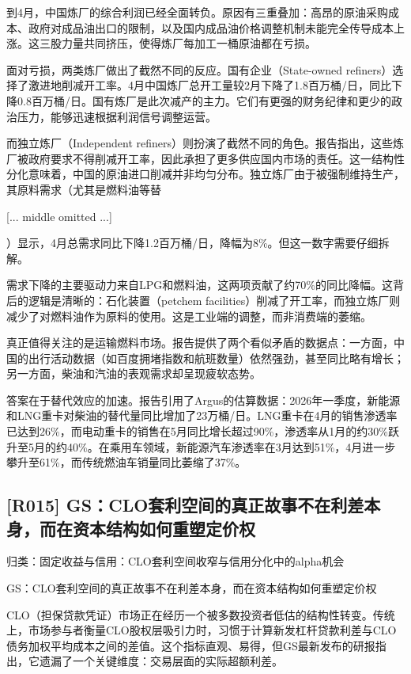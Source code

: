\documentclass[11pt]{ctexart}
\begin{document}
到4月，中国炼厂的综合利润已经全面转负。原因有三重叠加：高昂的原油采购成本、政府对成品油出口的限制，以及国内成品油价格调整机制未能完全传导成本上涨。这三股力量共同挤压，使得炼厂每加工一桶原油都在亏损。

面对亏损，两类炼厂做出了截然不同的反应。国有企业（State-owned refiners）选择了激进地削减开工率。4月中国炼厂总开工量较2月下降了1.8百万桶/日，同比下降0.8百万桶/日。国有炼厂是此次减产的主力。它们有更强的财务纪律和更少的政治压力，能够迅速根据利润信号调整运营。

而独立炼厂（Independent refiners）则扮演了截然不同的角色。报告指出，这些炼厂被政府要求不得削减开工率，因此承担了更多供应国内市场的责任。这一结构性分化意味着，中国的原油进口削减并非均匀分布。独立炼厂由于被强制维持生产，其原料需求（尤其是燃料油等替

[... middle omitted ...]

）显示，4月总需求同比下降1.2百万桶/日，降幅为8\%。但这一数字需要仔细拆解。

需求下降的主要驱动力来自LPG和燃料油，这两项贡献了约70\%的同比降幅。这背后的逻辑是清晰的：石化装置（petchem facilities）削减了开工率，而独立炼厂则减少了对燃料油作为原料的使用。这是工业端的调整，而非消费端的萎缩。

真正值得关注的是运输燃料市场。报告提供了两个看似矛盾的数据点：一方面，中国的出行活动数据（如百度拥堵指数和航班数量）依然强劲，甚至同比略有增长；另一方面，柴油和汽油的表观需求却呈现疲软态势。

答案在于替代效应的加速。报告引用了Argus的估算数据：2026年一季度，新能源和LNG重卡对柴油的替代量同比增加了23万桶/日。LNG重卡在4月的销售渗透率已达到26\%，而电动重卡的销售在5月同比增长超过90\%，渗透率从1月的约30\%跃升至5月的约40\%。在乘用车领域，新能源汽车渗透率在3月达到51\%，4月进一步攀升至61\%，而传统燃油车销量同比萎缩了37\%。

\subsection{[R015] GS：CLO套利空间的真正故事不在利差本身，而在资本结构如何重塑定价权}
{\small\color{refgray}归类：固定收益与信用：CLO套利空间收窄与信用分化中的alpha机会}

GS：CLO套利空间的真正故事不在利差本身，而在资本结构如何重塑定价权

CLO（担保贷款凭证）市场正在经历一个被多数投资者低估的结构性转变。传统上，市场参与者衡量CLO股权层吸引力时，习惯于计算新发杠杆贷款利差与CLO债务加权平均成本之间的差值。这个指标直观、易得，但GS最新发布的研报指出，它遗漏了一个关键维度：交易层面的实际超额利差。
\end{document}
